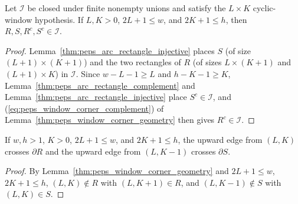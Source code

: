 \begin{lemma}%
    \label{thm:peps_window_corner_injectivity}
    \leanok
    Let $\mathcal I$ be closed under finite nonempty unions and satisfy the
    $L\times K$ cyclic-window hypothesis. If $L,K>0$, $2L+1\le w$, and
    $2K+1\le h$, then $R,S,R^c,S^c\in\mathcal I$.
\end{lemma}
\begin{proof}\leanok
    Lemma~\ref{thm:peps_arc_rectangle_injective} places $S$ (of size
    $(L+1)\times(K+1)$) and the two rectangles of $R$ (of sizes $L\times(K+1)$
    and $(L+1)\times K$) in $\mathcal I$. Since $w-L-1\ge L$ and $h-K-1\ge K$,
    Lemma~\ref{thm:peps_arc_rectangle_complement} and
    Lemma~\ref{thm:peps_arc_rectangle_injective} place $S^c\in\mathcal I$, and
    (\ref{eq:peps_window_corner_complement}) of
    Lemma~\ref{thm:peps_window_corner_geometry} then gives $R^c\in\mathcal I$.
\end{proof}

\begin{lemma}%
    \label{thm:peps_window_corner_boundary}
    \leanok
    If $w,h>1$, $K>0$, $2L+1\le w$, and $2K+1\le h$, the upward edge from
    $(L,K)$ crosses $\partial R$ and the upward edge from $(L,K-1)$ crosses
    $\partial S$.
\end{lemma}
\begin{proof}\leanok
    By Lemma~\ref{thm:peps_window_corner_geometry} and $2L+1\le w$, $2K+1\le h$,
    $(L,K)\notin R$ with $(L,K+1)\in R$, and $(L,K-1)\notin S$ with $(L,K)\in S$.
\end{proof}

